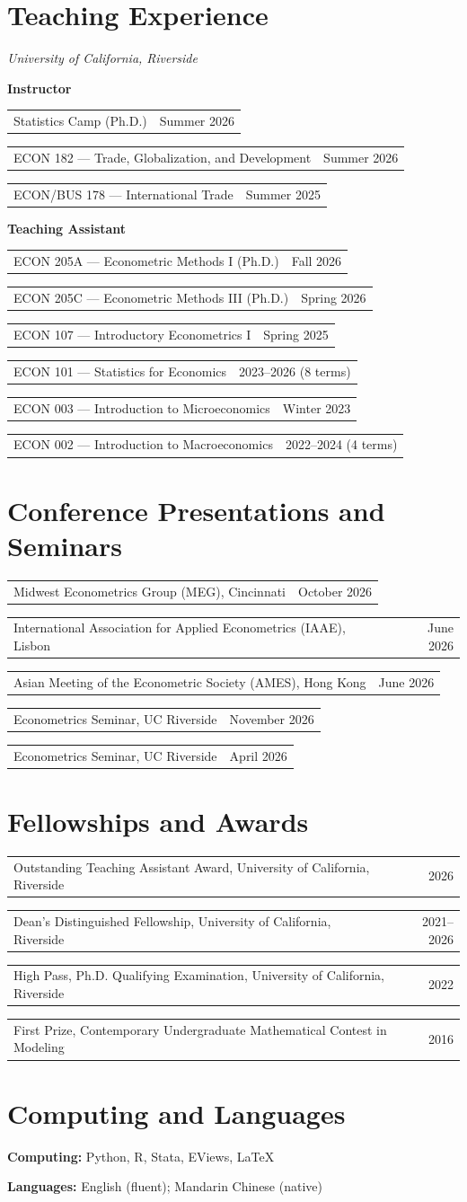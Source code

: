 \documentclass[11pt,letterpaper]{article}
\makeatletter
\newcommand{\cvrow}[2]{\begin{tabularx}{\textwidth}{@{}Xr@{}}#1&#2\end{tabularx}\par}
\makeatother
\begin{document}
\newpage
\section{Teaching Experience}
\textit{University of California, Riverside}\par
\vspace{2pt}
\textbf{Instructor}\par
\cvrow{Statistics Camp (Ph.D.)}{Summer 2026}
\cvrow{ECON 182 --- Trade, Globalization, and Development}{Summer 2026}
\cvrow{ECON/BUS 178 --- International Trade}{Summer 2025}
\vspace{5pt}
\textbf{Teaching Assistant}\par
\cvrow{ECON 205A --- Econometric Methods I (Ph.D.)}{Fall 2026}
\cvrow{ECON 205C --- Econometric Methods III (Ph.D.)}{Spring 2026}
\cvrow{ECON 107 --- Introductory Econometrics I}{Spring 2025}
\cvrow{ECON 101 --- Statistics for Economics}{2023--2026 (8 terms)}
\cvrow{ECON 003 --- Introduction to Microeconomics}{Winter 2023}
\cvrow{ECON 002 --- Introduction to Macroeconomics}{2022--2024 (4 terms)}

\section{Conference Presentations and Seminars}
\cvrow{Midwest Econometrics Group (MEG), Cincinnati}{October 2026}
\cvrow{International Association for Applied Econometrics (IAAE), Lisbon}{June 2026}
\cvrow{Asian Meeting of the Econometric Society (AMES), Hong Kong}{June 2026}
\cvrow{Econometrics Seminar, UC Riverside}{November 2026}
\cvrow{Econometrics Seminar, UC Riverside}{April 2026}

\section{Fellowships and Awards}
\cvrow{Outstanding Teaching Assistant Award, University of California, Riverside}{2026}
\cvrow{Dean's Distinguished Fellowship, University of California, Riverside}{2021--2026}
\cvrow{High Pass, Ph.D. Qualifying Examination, University of California, Riverside}{2022}
\cvrow{First Prize, Contemporary Undergraduate Mathematical Contest in Modeling}{2016}

\section{Computing and Languages}
\textbf{Computing:} Python, R, Stata, EViews, \LaTeX\par
\textbf{Languages:} English (fluent); Mandarin Chinese (native)
\end{document}
